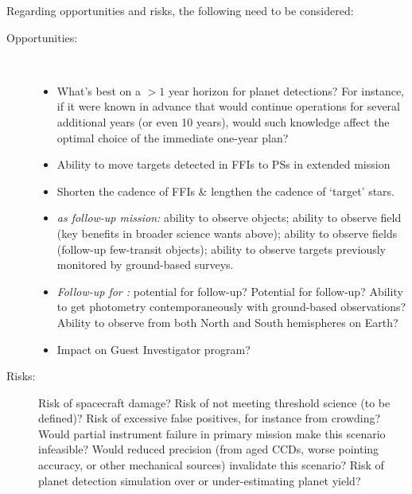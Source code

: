 Regarding opportunities and risks, the following need to be considered:
\begin{description}
	\item[Opportunities:]\ 
	\begin{itemize}
	\item What's best on a $>1$ year horizon for planet detections? For instance, if it were known in advance
          that \tess would continue operations for several additional years (or even 10 years), would such knowledge
          affect the optimal choice of the immediate one-year plan?
		\item Ability to move targets detected in FFIs to PSs in extended mission
		\item Shorten the cadence of FFIs \& lengthen the cadence of `target' stars.
		\item \textit{\tess as follow-up mission:} ability to
                  observe \corot objects; ability to observe \kepler
                  field (key benefits in broader science wants above);
                  ability to observe \ktwo fields (follow-up \ktwo
                  few-transit objects); ability to observe targets
                  previously monitored by ground-based surveys.
		\item \textit{Follow-up for \tess:} 
		potential for \jwst follow-up? 
		Potential for \cheops follow-up? 
		Ability to get \tess photometry contemporaneously with ground-based observations?
		Ability to observe from both North and South hemispheres on Earth?
		\item Impact on Guest Investigator program?
	\end{itemize}
	
	\item[Risks:] 
	Risk of spacecraft damage? 
	Risk of not meeting threshold science (to be defined)? 
	Risk of excessive false positives, for instance from crowding? 
	Would partial instrument failure in primary mission make this scenario infeasible? 
	Would reduced precision (from aged CCDs, worse pointing accuracy, or other mechanical sources) invalidate this scenario? 
	Risk of planet detection simulation over or under-estimating planet yield?
\end{description}
